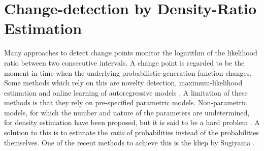\section{Change-detection by Density-Ratio Estimation}\label{sec:density-ratio}









Many approaches to detect change points monitor the logarithm of the likelihood ratio between two consecutive intervals.
A change point is regarded to be the moment in time when the underlying probabilistic generation function changes.
Some methods which rely on this are novelty detection, maximum-likelihood estimation and online learning of autoregressive models \cite{kawahara2009change}.
A limitation of these methods is that they rely on pre-specified parametric models.
Non-parametric models, for which the number and nature of the parameters are undetermined, for density estimation have been proposed, but it is said to be a hard problem \cite{hardle2004nonparametric, sugiyama2012density}.
A solution to this is to estimate the \emph{ratio} of probabilities instead of the probabilities themselves.
One of the recent methods to achieve this is the \gls{kliep} by Sugiyama \etal \cite{sugiyama2008direct}.

